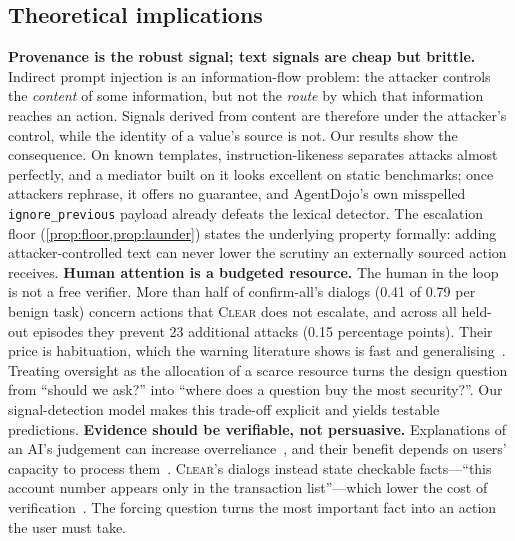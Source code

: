 \documentclass[preprint,12pt,nonatbib]{elsarticle}
\theoremstyle{remark}
\newcommand{\clear}{\textsc{Clear}}
\begin{document}
\subsection{Theoretical implications}
\label{sec:theory}
\textbf{Provenance is the robust signal; text signals are cheap but brittle.}
Indirect prompt injection is an information-flow problem: the attacker controls
the \emph{content} of some information, but not the \emph{route} by which that
information reaches an action. Signals derived from content are therefore under
the attacker's control, while the identity of a value's source is not. Our
results show the consequence. On known templates, instruction-likeness separates
attacks almost perfectly, and a mediator built on it looks excellent on static
benchmarks; once attackers rephrase, it offers no guarantee, and AgentDojo's own
misspelled \texttt{ignore\_previous} payload already defeats the lexical
detector. The escalation floor (\cref{prop:floor,prop:launder}) states the
underlying property formally: adding attacker-controlled text can never lower
the scrutiny an externally sourced action receives.
\textbf{Human attention is a budgeted resource.} The human in the loop is not a
free verifier. More than half of confirm-all's dialogs (0.41 of 0.79 per benign
task) concern actions that \clear{} does not escalate, and across all held-out
episodes they prevent 23 additional attacks (0.15 percentage points). Their price
is habituation, which the warning literature shows is fast and
generalising~\citep{anderson2015polymorphic,vance2025fog}. Treating oversight as
the allocation of a scarce resource turns the design question from ``should we
ask?'' into ``where does a question buy the most security?''. Our signal-detection
model makes this trade-off explicit and yields testable predictions.
\textbf{Evidence should be verifiable, not persuasive.} Explanations of an AI's
judgement can increase overreliance~\citep{bansal2021whole}, and their benefit
depends on users' capacity to process them~\citep{wang2024rationality}.
\clear{}'s dialogs instead state checkable facts---``this account number appears
only in the transaction list''---which lower the cost of
verification~\citep{vasconcelos2023explanations}. The forcing question turns the
most important fact into an action the user must take.
\end{document}
